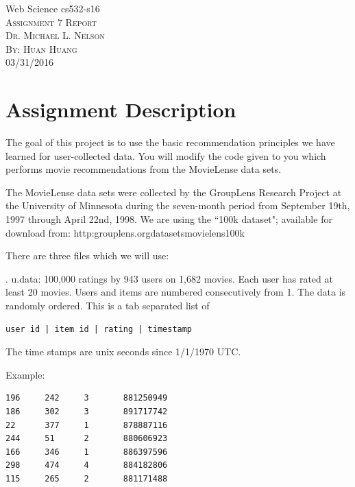 \documentclass[12pt]{article}
\begin{document}
\begin{titlepage}
	\begin{center}
	\Huge{Web Science cs532-s16}\\
	[0.25in]
	\textsc{\Large Assignment 7 Report}\\
	\textsc{\normalsize Dr. Michael L. Nelson}\\
	[4.25in]
	\textsc{\normalsize By: Huan Huang}\\
	\large 03/31/2016\\
	
	
	\end{center}
\end{titlepage}
\newpage


\section*{Assignment Description}

The goal of this project is to use the basic recommendation principles
we have learned for user-collected data. You will modify the code
given to you which performs movie recommendations from the MovieLense
data sets.

The MovieLense data sets were collected by the GroupLens Research
Project at the University of Minnesota during the seven-month period
from September 19th, 1997 through April 22nd, 1998.  We are using the 
``100k dataset"; available for download from:
http:\/\/grouplens.org\/datasets\/movielens\/100k\/

\noindent
There are three files which we will use:

.  u.data: 100,000 ratings by 943 users on 1,682 movies. Each
user has rated at least 20 movies. Users and items are numbered
consecutively from 1. The data is randomly ordered. This is a tab
separated list of 

\begin{verbatim}
user id | item id | rating | timestamp
\end{verbatim}

\noindent
The time stamps are unix seconds since 1/1/1970 UTC.

\noindent
Example:

\begin{verbatim}
196     242     3       881250949
186     302     3       891717742
22      377     1       878887116
244     51      2       880606923
166     346     1       886397596
298     474     4       884182806
115     265     2       881171488
\end{verbatim}
\end{document}
